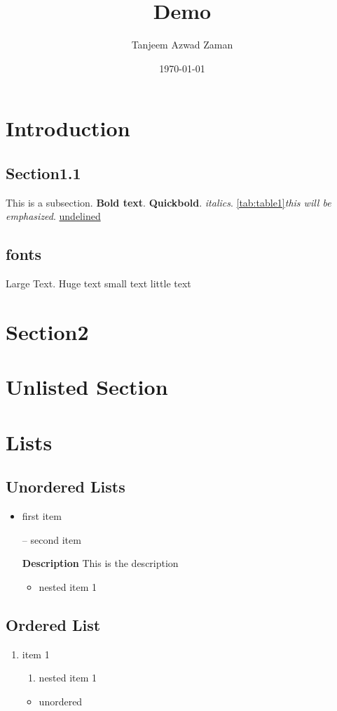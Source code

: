 \documentclass{article}
\title{Demo}
\author{Tanjeem Azwad Zaman}
\date{\today}
\begin{document}
\maketitle
\pagebreak
\tableofcontents
\pagebreak
\listoftables
\pagebreak
% 
\section{Introduction}
    \subsection{Section1.1}
        This is a subsection. \textbf{Bold text}. \textbf{Quickbold}. \textit{italics}. \ref{tab:table1}\emph{this will be emphasized}. \underline{undelined}
    \subsection{fonts}
        \Large{Large Text}. {\huge Huge text} \small{small text} {\small little text }
\section{Section2}

\section*{Unlisted Section}
\section{Lists}
    \subsection{Unordered Lists}
        \begin{itemize}
            \item first item
            \item [--] second item
            \item [\textbf{Description}] This is the description

            \begin{itemize}
                \item nested item 1
            \end{itemize}
        \end{itemize}
    \subsection{Ordered List}
        \begin{enumerate}
            \item item 1
            \begin{enumerate}
                \item nested item 1
            \end{enumerate}
            \begin{itemize}
                \item unordered
            \end{itemize}
        \end{enumerate}
        
\end{document}
